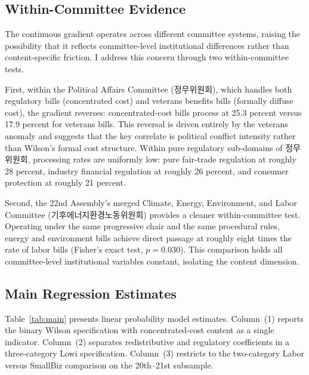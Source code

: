 \documentclass[11pt]{article}
\begin{document}
\subsection{Within-Committee Evidence}

The continuous gradient operates across different committee systems, raising the possibility that it reflects committee-level institutional differences rather than content-specific friction. I address this concern through two within-committee tests.

First, within the Political Affairs Committee (정무위원회), which handles both regulatory bills (concentrated cost) and veterans benefits bills (formally diffuse cost), the gradient reverses: concentrated-cost bills process at 25.3 percent versus 17.9 percent for veterans bills. This reversal is driven entirely by the veterans anomaly and suggests that the key correlate is political conflict intensity rather than Wilson's formal cost structure. Within pure regulatory sub-domains of 정무위원회, processing rates are uniformly low: pure fair-trade regulation at roughly 28 percent, industry financial regulation at roughly 26 percent, and consumer protection at roughly 21 percent.

Second, the 22nd Assembly's merged Climate, Energy, Environment, and Labor Committee (기후에너지환경노동위원회) provides a cleaner within-committee test. Operating under the same progressive chair and the same procedural rules, energy and environment bills achieve direct passage at roughly eight times the rate of labor bills (Fisher's exact test, $p = 0.030$). This comparison holds all committee-level institutional variables constant, isolating the content dimension.

\subsection{Main Regression Estimates}

Table~\ref{tab:main} presents linear probability model estimates. Column~(1) reports the binary Wilson specification with concentrated-cost content as a single indicator. Column~(2) separates redistributive and regulatory coefficients in a three-category Lowi specification. Column~(3) restricts to the two-category Labor versus SmallBiz comparison on the 20th--21st subsample.
\end{document}
